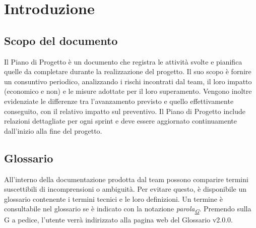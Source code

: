 \documentclass[a4paper,12pt]{article}
\begin{document}
\section{Introduzione}{
    \subsection{Scopo del documento}{
        Il Piano di Progetto è un documento che registra le attività svolte e pianifica quelle da completare durante la realizzazione del progetto. Il suo scopo è fornire un consuntivo 
        periodico, analizzando i rischi incontrati dal team, il loro impatto (economico e non) e le misure adottate per il loro superamento. Vengono inoltre evidenziate le differenze 
        tra l'avanzamento previsto e quello effettivamente conseguito, con il relativo impatto sul preventivo. Il Piano di Progetto include relazioni dettagliate per ogni sprint e 
        deve essere aggiornato continuamente dall'inizio alla fine del progetto.
    }
    \subsection{Glossario}{
        All'interno della documentazione prodotta dal team possono comparire termini suscettibili di incomprensioni o ambiguità. Per evitare questo, è disponibile un glossario contenente i termini tecnici e le loro definizioni. Un termine è consultabile nel glossario se è indicato con la notazione \textit{parola\textsubscript{\href{https://atlasteam9.github.io/Atlas/glossario.html}{G}}}.
        Premendo sulla G a pedice, l'utente verrà indirizzato alla pagina web del Glossario v2.0.0.
    }
}
\end{document}
